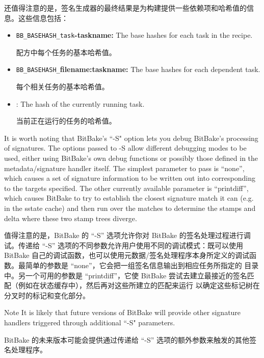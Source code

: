 还值得注意的是，签名生成器的最终结果是为构建提供一些依赖项和哈希值的信息。这些信息包括：

\begin{itemize}
\setlength\itemsep{1.0em}
\item \texttt{BB\_BASEHASH\_task}\textbf{-taskname:} The base hashes for each task in the recipe.\par
配方中每个任务的基本哈希值。

\item \texttt{BB\_BASEHASH\_}\textbf{filename:taskname:} The base hashes for each dependent task.\par
每个相关任务的基本哈希值。

\item {}: The hash of the currently running task.\par
当前正在运行的任务的哈希值。
\end{itemize}

It is worth noting that BitBake's ``-S" option lets you debug BitBake's processing of signatures. The options passed to -S allow different debugging modes to be used, either using BitBake's own debug functions or possibly those defined in the metadata/signature handler itself. The simplest parameter to pass is ``none'', which causes a set of signature information to be written out into  corresponding to the targets specified. The other currently available parameter is ``printdiff'', which causes BitBake to try to establish the closest signature match it can (e.g. in the sstate cache) and then run  over the matches to determine the stamps and delta where these two stamp trees diverge.

值得注意的是，BitBake 的 ``-S'' 选项允许你对 BitBake 的签名处理过程进行调试。传递给 ``-S'' 选项的不同参数允许用户使用不同的调试模式：既可以使用 BitBake 自己的调试函数，也可以使用元数据/签名处理程序本身所定义的调试函数。最简单的参数是 ``none''，它会把一组签名信息输出到相应任务所指定的  目录中。另一个可用的参数是 ``printdiff''，它使 BitBake 尝试去建立最接近的签名匹配（例如在状态缓存中），然后再对这些所建立的匹配来运行  以确定这些标记树在分叉时的标记和变化部分。



\begin{noteblock}{Note}%
It is likely that future versions of BitBake will provide other signature handlers triggered through additional ``-S" parameters.

\medskip
BitBake 的未来版本可能会提供通过传递给 ``-S'' 选项的额外参数来触发的其他签名处理程序。
\end{noteblock}


